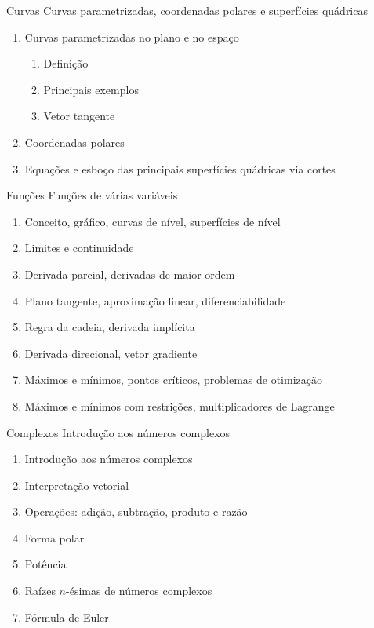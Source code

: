 \documentclass[fleqn,utf8,aspectratio=169,12pt,ignorenonframetext]{beamer}
\begin{document}
\begin{frame}{Curvas}
  Curvas parametrizadas, coordenadas polares e superfícies quádricas
  \begin{enumerate}[<+->]
    \item Curvas parametrizadas no plano e no espaço
    \begin{enumerate}
      \item Definição
      \item Principais exemplos
      \item Vetor tangente
    \end{enumerate}
    \item Coordenadas polares
    \item Equações e esboço das principais superfícies quádricas via cortes
  \end{enumerate}
\end{frame}

\begin{frame}{Funções}
  Funções de várias variáveis
  \begin{enumerate}[<+->]
    \item Conceito, gráfico, curvas de nível, superfícies de nível
    \item Limites e continuidade
    \item Derivada parcial, derivadas de maior ordem
    \item Plano tangente, aproximação linear, diferenciabilidade
    \item Regra da cadeia, derivada implícita
    \item Derivada direcional, vetor gradiente
    \item Máximos e mínimos, pontos críticos, problemas de otimização
    \item Máximos e mínimos com restrições, multiplicadores de Lagrange
  \end{enumerate}
\end{frame}

\begin{frame}{Complexos}
  Introdução aos números complexos
  \begin{enumerate}[<+->]
    \item Introdução aos números complexos
    \item Interpretação vetorial
    \item Operações: adição, subtração, produto e razão
    \item Forma polar
    \item Potência
    \item Raízes $n$-ésimas de números complexos
    \item Fórmula de Euler
  \end{enumerate}
\end{frame}
\end{document}

